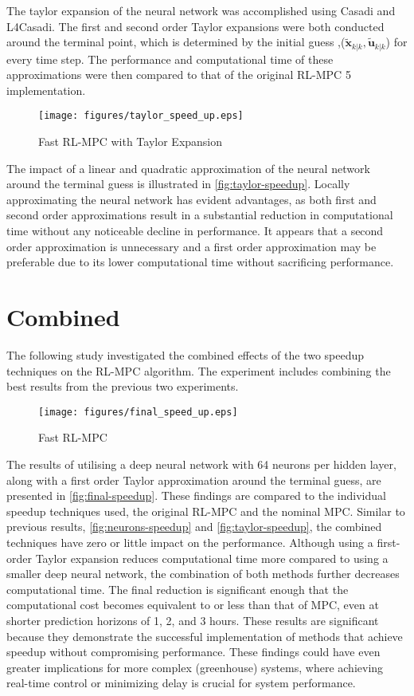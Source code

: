 The taylor expansion of the neural network was accomplished using Casadi and L4Casadi. The first and second order Taylor expansions were both conducted around the terminal point, which is determined by the initial guess ,($\tilde{\mathbf{x}}_{k|k},\tilde{\mathbf{u}}_{k|k}$) for every time step. The performance and computational time of these approximations were then compared to that of the original RL-MPC 5 implementation.


\begin{figure}[H]
	\centering
	\texttt{[image: figures/taylor\_speed\_up.eps]}
	\caption{Fast RL-MPC with Taylor Expansion}
	\label{fig:taylor-speedup}
\end{figure}

The impact of a linear and quadratic approximation of the neural network around the terminal guess is illustrated in \autoref{fig:taylor-speedup}. Locally approximating the neural network has evident advantages, as both first and second order approximations result in a substantial reduction in computational time without any noticeable decline in performance. It appears that a second order approximation is unnecessary and a first order approximation may be preferable due to its lower computational time without sacrificing performance.


\section{Combined}
The following study investigated the combined effects of the two speedup techniques on the RL-MPC algorithm. The experiment includes combining the best results from the previous two experiments.


\begin{figure}[H]
	\centering
	\texttt{[image: figures/final\_speed\_up.eps]}
	\caption{Fast RL-MPC}
	\label{fig:final-speedup}
\end{figure}


The results of utilising a deep neural network with 64 neurons per hidden layer, along with a first order Taylor approximation around the terminal guess, are presented in \autoref{fig:final-speedup}. These findings are compared to the individual speedup techniques used, the original RL-MPC and the nominal MPC. Similar to previous results, \autoref{fig:neurons-speedup} and \autoref{fig:taylor-speedup}, the combined techniques have zero or little impact on the performance. Although using a first-order Taylor expansion reduces computational time more compared to using a smaller deep neural network, the combination of both methods further decreases computational time. The final  reduction is significant enough that the computational cost becomes equivalent to or less than that of MPC, even at shorter prediction horizons of 1, 2, and 3 hours. These results are significant because they demonstrate the successful implementation of methods that achieve speedup without compromising performance. These findings could have even greater implications for more complex (greenhouse) systems, where achieving real-time control or minimizing delay is crucial for system performance.



